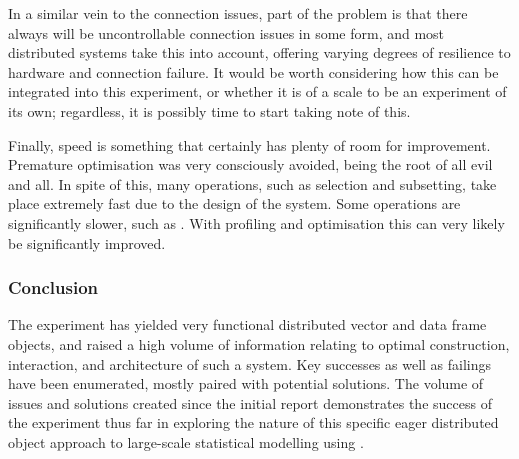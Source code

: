 In a similar vein to the connection issues, part of the problem is that there always will be uncontrollable connection issues in some form, and most distributed systems take this into account, offering varying degrees of resilience to hardware and connection failure.
It would be worth considering how this can be integrated into this experiment, or whether it is of a scale to be an experiment of its own; regardless, it is possibly time to start taking note of this.

Finally, speed is something that certainly has plenty of room for improvement.
Premature optimisation was very consciously avoided, being the root of all evil and all.
In spite of this, many operations, such as selection and subsetting, take place extremely fast due to the design of the system.
Some operations are significantly slower, such as .
With profiling and optimisation this can very likely be significantly improved.

\subsubsection{Conclusion}\label{conclusion}

The experiment has yielded very functional distributed vector and data frame objects, and raised a high volume of information relating to optimal construction, interaction, and architecture of such a system.
Key successes as well as failings have been enumerated, mostly paired with potential solutions.
The volume of issues and solutions created since the initial report demonstrates the success of the experiment thus far in exploring the nature of this specific eager distributed object approach to large-scale statistical modelling using \R{}.

